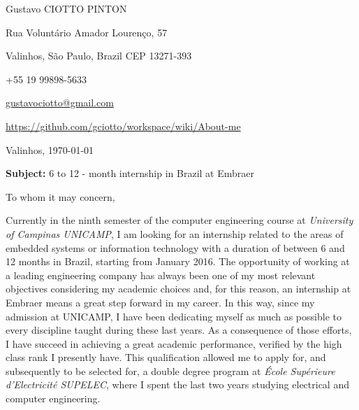 \documentclass[12pt, a4paper]{article}
\begin{document}
\pagestyle{empty} 

Gustavo CIOTTO PINTON

Rua Voluntário Amador Lourenço, 57

Valinhos, São Paulo, Brazil CEP 13271-393

+55 19 99898-5633

 \url{gustavociotto@gmail.com}

\url{https://github.com/gciotto/workspace/wiki/About-me}
\begin{flushright}
\vspace{-12pt}
Valinhos,  \today





\end{flushright}

\textbf{Subject:} 6 to 12 - month internship in Brazil at Embraer

\vspace{12pt} 

To whom it may concern, 

\vspace{12pt}
Currently in the ninth semester of the computer engineering course at
\textit{University of Campinas UNICAMP}, I am looking for an internship related
to the areas of embedded systems or information technology with  a duration of
between 6 and 12 months in Brazil, starting from January 2016. The
opportunity of working at a leading engineering company has always been one of my most relevant objectives considering my academic choices and, for this reason, an
internship at Embraer means a great step forward in my career. In this
way, since my admission at UNICAMP, I have been dedicating myself as much as possible to every
discipline taught during these last years. As a consequence of those
efforts, I have succeed in achieving a great academic performance, verified by
the high class rank I presently have. This qualification allowed me to apply
for, and subsequently to be selected for, a double degree program at
\textit{École Supérieure d'Electricité SUPELEC}, where I spent the last two
years studying electrical and computer engineering.  
\end{document}
